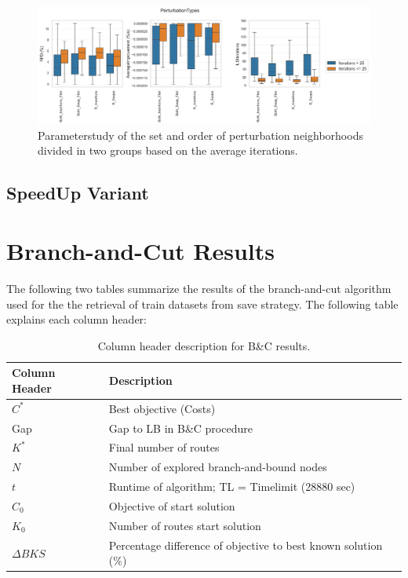 \begin{figure}[!ht]
    \centering
    \includegraphics[width=\textwidth]{pictures/parameter_study/PerturbationTypes_base_parameter_study.png}
    \caption{Parameterstudy of the set and order of perturbation neighborhoods divided in two groups based on the average iterations.}
    \label{fig:parameterstudy_NoClassifier_perturbation}
\end{figure}

\subsection{SpeedUp Variant}
\label{app:subsec:parameterstudy_SpeedUp}

\clearpage
\section{Branch-and-Cut Results}

The following two tables summarize the results of the branch-and-cut algorithm used for the the retrieval of train datasets
from save strategy. The following table explains each column header:

\begin{table}[ht]
    \centering
    \begin{tabular}{C{0.2\textwidth}C{0.75\textwidth}}
        \toprule
        Column Header & Description                                                    \\
        \midrule
        $C^*$         & Best objective (Costs)                                         \\
        Gap           & Gap to \gls{LB} in B\&C procedure                              \\
        $K^*$         & Final number of routes                                         \\
        $N$           & Number of explored branch-and-bound nodes                      \\
        $t$           & Runtime of algorithm; TL = Timelimit (28880 sec)               \\
        $C_0$         & Objective of start solution                                    \\
        $K_0$         & Number of routes start solution                                \\
        $\Delta BKS$  & Percentage difference of objective to best known solution (\%) \\
        \bottomrule
    \end{tabular}
    \caption{Column header description for B\&C results.}
    \label{tab:column_header_description_bc}
\end{table}

